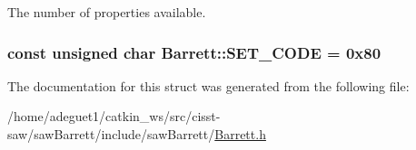 The number of properties available. 

\hypertarget{struct_barrett_a746e1d4f09073391ae23fecb646ab0f9}{
\subsubsection[{S\-E\-T\-\_\-\-C\-O\-D\-E}]{\setlength{\rightskip}{0pt plus 5cm}const unsigned char Barrett\-::\-S\-E\-T\-\_\-\-C\-O\-D\-E = 0x80\hspace{0.3cm}{\ttfamily [static]}}}\label{struct_barrett_a746e1d4f09073391ae23fecb646ab0f9}


The documentation for this struct was generated from the following file\-:\begin{DoxyCompactItemize}
\item 
/home/adeguet1/catkin\-\_\-ws/src/cisst-\/saw/saw\-Barrett/include/saw\-Barrett/\hyperlink{_barrett_8h}{Barrett.\-h}\end{DoxyCompactItemize}
